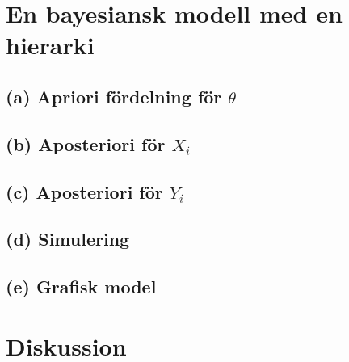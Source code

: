 \documentclass{assignment}
\begin{document}
\newpage
\section{En bayesiansk modell med en hierarki}
\subsection*{(a) Apriori fördelning för $\theta$} 
\subsection*{(b) Aposteriori för $X_i$}
\subsection*{(c) Aposteriori för $Y_i$}
\subsection*{(d) Simulering}
\subsection*{(e) Grafisk model}
\section{Diskussion}

%  
\end{document}
